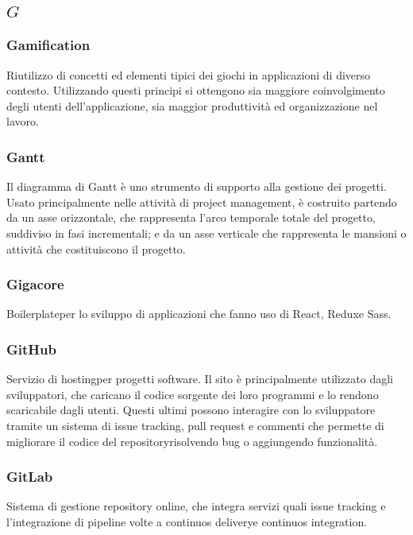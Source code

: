 \subsection*{\quad$G\quad$}
\subsubsection*{Gamification}
Riutilizzo di concetti ed elementi tipici dei giochi in applicazioni di diverso contesto. Utilizzando questi principi si ottengono sia maggiore coinvolgimento degli utenti dell'applicazione, sia maggior produttività ed organizzazione nel lavoro.

\subsubsection*{Gantt}
Il diagramma di Gantt è uno strumento di supporto alla gestione dei progetti. Usato principalmente nelle attività di project management, è costruito partendo da un asse orizzontale, che rappresenta l'arco temporale totale del progetto, suddiviso in fasi incrementali; e da un asse
verticale che rappresenta le mansioni o attività che costituiscono il progetto.

\subsubsection*{Gigacore}
Boilerplate\glosp per lo sviluppo di applicazioni che fanno uso di React\glo, Redux\glosp e Sass\glo.

\subsubsection*{GitHub}
Servizio di hosting\glosp per progetti software. Il sito è principalmente utilizzato dagli sviluppatori, che caricano il codice sorgente dei loro programmi e lo rendono scaricabile dagli utenti. Questi ultimi possono interagire con lo sviluppatore tramite un sistema di issue tracking, pull request e commenti che permette di migliorare il codice del repository\glosp risolvendo bug o aggiungendo funzionalità.

\subsubsection*{GitLab}
Sistema di gestione repository online, che integra servizi quali issue tracking e l’integrazione di pipeline volte a continuos delivery\glosp e continuos integration\glo.

